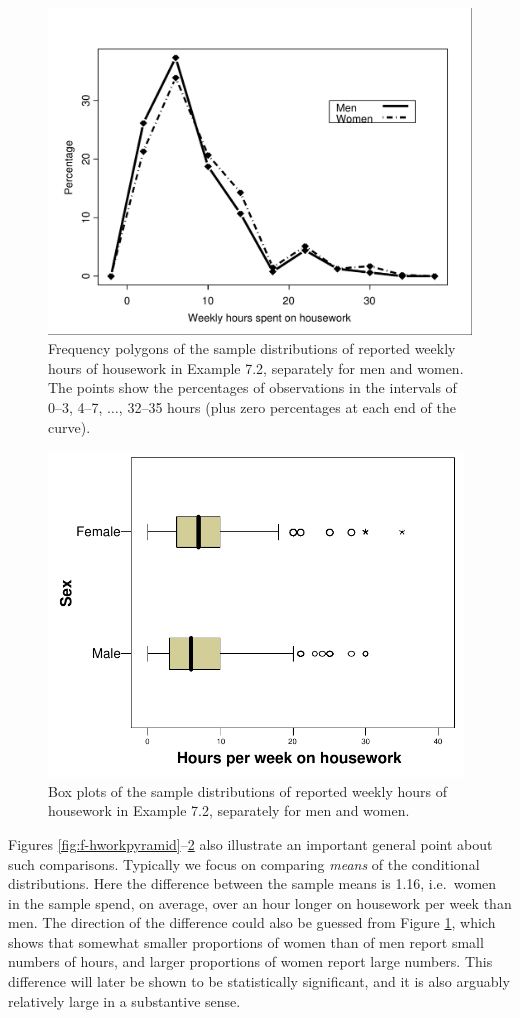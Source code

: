 \documentclass[11pt,a4paper,openany]{book}
\begin{document}
\begin{figure}[htbp]
\centering
\includegraphics[width=11.50000cm]{hwork.pdf}
\caption{\label{fig:f-hworkpolygons} Frequency polygons of the sample
distributions of reported weekly hours of housework in Example 7.2,
separately for men and women. The points show the percentages of
observations in the intervals of 0--3, 4--7, \(\dots\), 32--35 hours
(plus zero percentages at each end of the curve).}
\end{figure}

\begin{figure}[htbp]
\centering
\includegraphics[width=11.00000cm]{twoboxplots.pdf}
\caption{\label{fig:f-twoboxplots} Box plots of the sample distributions of
reported weekly hours of housework in Example 7.2, separately for men
and women.}
\end{figure}

Figures \ref{fig:f-hworkpyramid}--\ref{fig:f-twoboxplots} also
illustrate an important general point about such comparisons. Typically
we focus on comparing \emph{means} of the conditional distributions.
Here the difference between the sample means is 1.16, i.e.~women in the
sample spend, on average, over an hour longer on housework per week than
men. The direction of the difference could also be guessed from Figure
\ref{fig:f-hworkpolygons}, which shows that somewhat smaller proportions
of women than of men report small numbers of hours, and larger
proportions of women report large numbers. This difference will later be
shown to be statistically significant, and it is also arguably
relatively large in a substantive sense.
\end{document}
